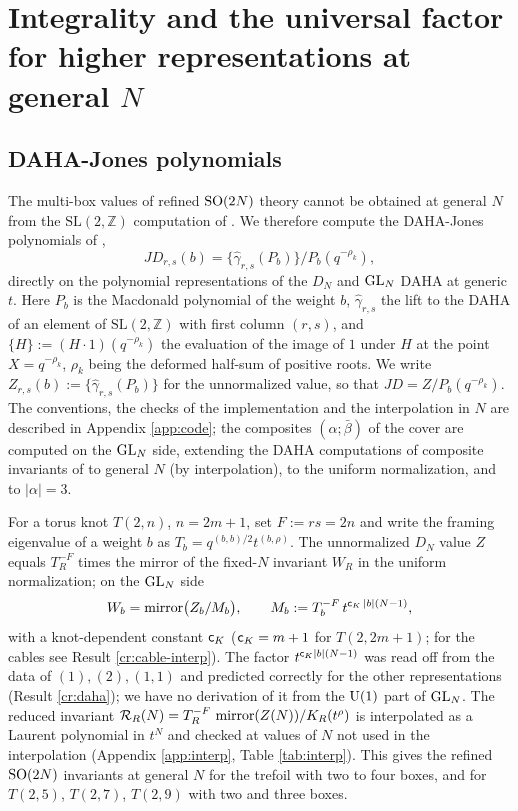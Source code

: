 \section{Integrality and the universal factor for higher representations at general $N$}\label{sec:generalN}

\subsection{DAHA-Jones polynomials}\label{sec:daha}
The multi-box values of refined $\mathrm{SO}(2N)$ theory cannot be obtained at general $N$ from the $\mathrm{SL}(2,\mathbb{Z})$ computation of \cite{AgSc12}. We therefore compute the DAHA-Jones polynomials of \cite{Cherednik11},
\begin{equation}\label{eq:JD}
JD_{r,s}(b) = \{\hat\gamma_{r,s}(P_b)\}/P_b(q^{-\rho_k}),
\end{equation}
directly on the polynomial representations of the $D_N$ and $\mathrm{GL}_N$ DAHA at generic $t$. Here $P_b$ is the Macdonald polynomial of the weight $b$, $\hat\gamma_{r,s}$ the lift to the DAHA of an element of $\mathrm{SL}(2,\mathbb{Z})$ with first column $(r,s)$, and $\{H\} := (H\cdot 1)(q^{-\rho_k})$ the evaluation of the image of $1$ under $H$ at the point $X = q^{-\rho_k}$, $\rho_k$ being the deformed half-sum of positive roots. We write $Z_{r,s}(b) := \{\hat\gamma_{r,s}(P_b)\}$ for the unnormalized value, so that $JD = Z/P_b(q^{-\rho_k})$. The conventions, the checks of the implementation and the interpolation in $N$ are described in Appendix \ref{app:code}; the composites $(\alpha;\bar\beta)$ of the cover are computed on the $\mathrm{GL}_N$ side, extending the DAHA computations of composite invariants of \cite{CE15} to general $N$ (by interpolation), to the uniform normalization, and to $|\alpha| = 3$.

For a torus knot $T(2,n)$, $n = 2m+1$, set $F := rs = 2n$ and write the framing eigenvalue of a weight $b$ as $T_b = q^{(b,b)/2}t^{(b,\rho)}$. The unnormalized $D_N$ value $Z$ equals $T_R^{-F}$ times the mirror of the fixed-$N$ invariant $W_R$ in the uniform normalization; on the $\mathrm{GL}_N$ side
\begin{equation}\label{eq:Mb}
W_b = \operatorname{mirror}\bigl(Z_b/M_b\bigr),\qquad M_b := T_b^{-F}\, t^{\mathsf{c}_K\,|b|(N-1)},
\end{equation}
with a knot-dependent constant $\mathsf{c}_K$ ($\mathsf{c}_K = m+1$ for $T(2,2m+1)$; for the cables see Result \ref{cr:cable-interp}). The factor $t^{\mathsf{c}_K|b|(N-1)}$ was read off from the data of $(1), (2), (1,1)$ and predicted correctly for the other representations (Result \ref{cr:daha}); we have no derivation of it from the $\mathrm{U}(1)$ part of $\mathrm{GL}_N$. The reduced invariant $\mathcal{R}_R(N) = T_R^{-F}\,\operatorname{mirror}(Z(N))/K_R(t^\rho)$ is interpolated as a Laurent polynomial in $t^N$ and checked at values of $N$ not used in the interpolation (Appendix \ref{app:interp}, Table \ref{tab:interp}). This gives the refined $\mathrm{SO}(2N)$ invariants at general $N$ for the trefoil with two to four boxes, and for $T(2,5)$, $T(2,7)$, $T(2,9)$ with two and three boxes.

